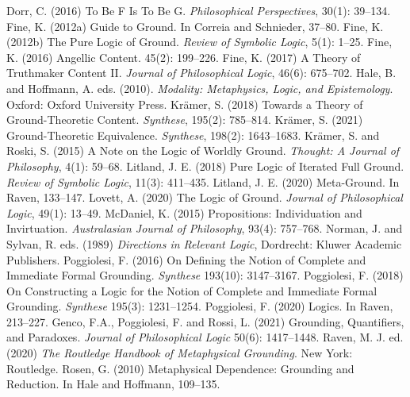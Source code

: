 \documentclass[twoside,14Q,uplatex,dvipdfmx]{jsarticle}
\theoremstyle{definition}
\begin{document}
\begin{thebibliography}{99}
 Dorr, C. (2016) To Be F Is To Be G. \emph{Philosophical Perspectives}, 30(1): 39--134.
 Fine, K. (2012a) Guide to Ground. In Correia and Schnieder\cite{CorreiaSchnieder2012}, 37--80.
 Fine, K. (2012b) The Pure Logic of Ground. \emph{Review of Symbolic Logic}, 5(1): 1--25.
 Fine, K. (2016) Angellic Content. 45(2): 199--226.
 Fine, K. (2017) A Theory of Truthmaker Content II. \emph{Journal of Philosophical Logic}, 46(6): 675--702.
 Hale, B. and Hoffmann, A. eds. (2010). \emph{Modality: Metaphysics, Logic, and Epistemology}. Oxford: Oxford University Press.
 Kr\"{a}mer, S. (2018) Towards a Theory of Ground-Theoretic Content. \emph{Synthese}, 195(2): 785--814.
 Kr\"{a}mer, S. (2021) Ground-Theoretic Equivalence. \emph{Synthese}, 198(2): 1643--1683.
 Kr\"{a}mer, S. and Roski, S. (2015) A Note on the Logic of Worldly Ground. \emph{Thought: A Journal of Philosophy}, 4(1): 59--68.
 Litland, J. E. (2018) Pure Logic of Iterated Full Ground. \emph{Review of Symbolic Logic}, 11(3): 411--435.
 Litland, J. E. (2020) Meta-Ground. In Raven\cite{Raven2020}, 133--147.
 Lovett, A. (2020) The Logic of Ground. \emph{Journal of Philosophical Logic}, 49(1): 13--49.
 McDaniel, K. (2015) Propositions: Individuation and Invirtuation. \emph{Australasian Journal of Philosophy}, 93(4): 757--768.
 Norman, J. and Sylvan, R. eds. (1989) \emph{Directions in Relevant Logic}, Dordrecht: Kluwer Academic Publishers.
 Poggiolesi, F. (2016) On Defining the Notion of Complete and Immediate Formal Grounding. \emph{Synthese} 193(10): 3147--3167.
 Poggiolesi, F. (2018) On Constructing a Logic for the Notion of Complete and Immediate Formal Grounding. \emph{Synthese} 195(3): 1231--1254.
 Poggiolesi, F. (2020) Logics. In Raven\cite{Raven2020}, 213--227.
 Genco, F.A., Poggiolesi, F. and Rossi, L. (2021) Grounding, Quantifiers, and Paradoxes. \emph{Journal of Philosophical Logic} 50(6): 1417--1448.
 Raven, M. J. ed. (2020) \emph{The Routledge Handbook of Metaphysical Grounding}. New York: Routledge.
 Rosen, G. (2010) Metaphysical Dependence: Grounding and Reduction. In Hale and Hoffmann\cite{HaleandHoffmann2010}, 109--135.
\end{thebibliography}
\end{document}
